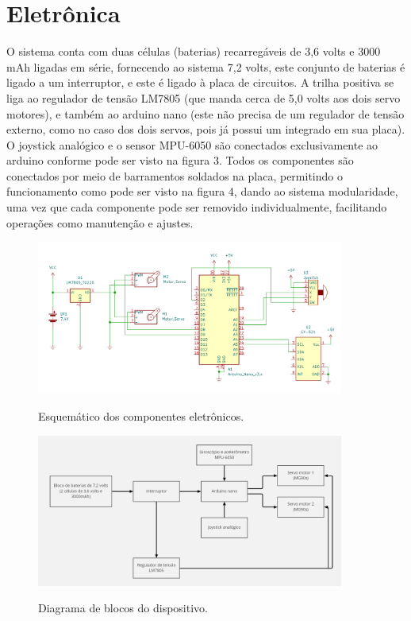\section{Eletrônica}
O sistema conta com duas células (baterias) recarregáveis de 3,6 volts e 3000 mAh ligadas em série, fornecendo ao sistema 7,2 volts, este conjunto de baterias é ligado a um interruptor, e este é ligado à placa de circuitos. A trilha positiva se liga ao regulador de tensão LM7805 (que manda cerca de 5,0 volts aos dois servo motores), e também ao arduino nano (este não precisa de um regulador de tensão externo, como no caso dos dois servos, pois já possui um integrado em sua placa). O joystick analógico e o sensor MPU-6050 são conectados exclusivamente ao arduino conforme pode ser visto na figura 3. Todos os componentes são conectados por meio de barramentos soldados na placa, permitindo o funcionamento como pode ser visto na figura 4, dando ao sistema modularidade, uma vez que cada componente pode ser removido individualmente, facilitando operações como manutenção e ajustes.

\begin{figure}[H]
\centering
\includegraphics[width=0.9\textwidth]{Capitulo2 - Hardware/Esquematico.PNG}\\
\caption{\label{fig:widgets}Esquemático dos componentes eletrônicos.}
\end{figure}

\begin{figure}[H]
\centering
\includegraphics[width=0.9\textwidth]{Capitulo2 - Hardware/DiagramaDeBlocos.png}\\
\caption{\label{fig:widgets}Diagrama de blocos do dispositivo.}
\end{figure}


